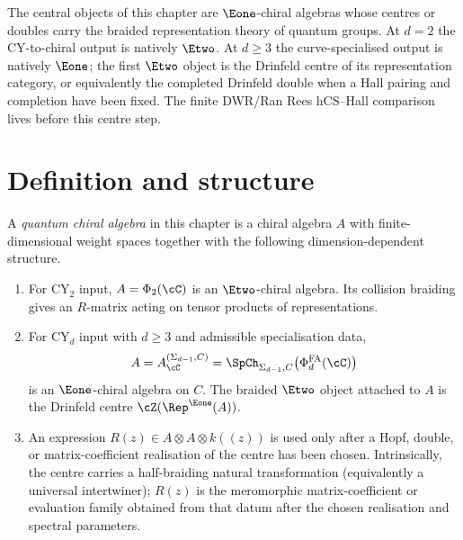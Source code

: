 The central objects of this chapter are $\Eone$-chiral algebras whose
centres or doubles carry the braided representation theory of quantum
groups.  At $d=2$ the CY-to-chiral output is natively $\Etwo$.  At
$d\geq 3$ the curve-specialised output is natively $\Eone$; the first
$\Etwo$ object is the Drinfeld centre of its representation category, or
equivalently the completed Drinfeld double when a Hall pairing and
completion have been fixed.  The finite DWR/Ran Rees hCS--Hall
comparison lives before this centre step.

\section{Definition and structure}
\label{sec:qca-definition}

\begin{definition}
\label{def:qca-dimension-stratified}
A \emph{quantum chiral algebra} in this chapter is a chiral algebra $A$
with finite-dimensional weight spaces together with the following
dimension-dependent structure.
\begin{enumerate}[label=\textup{(\roman*)}]
\item For CY$_2$ input, $A=\Phi_2(\cC)$ is an $\Etwo$-chiral algebra.
Its collision braiding gives an $R$-matrix acting on tensor products of
representations.
\item For CY$_d$ input with $d\geq3$ and admissible specialisation data,
\[
 A=A_{\cC}^{(\Sigma_{d-1},C)}
   =\SpCh_{\Sigma_{d-1},C}\bigl(\PhiFA_d(\cC)\bigr)
\]
is an $\Eone$-chiral algebra on $C$.  The braided $\Etwo$ object
attached to $A$ is the Drinfeld centre
$\cZ(\Rep^{\Eone}(A))$.
\item An expression \(R(z)\in A\otimes A\otimes k((z))\) is used only
after a Hopf, double, or matrix-coefficient realisation of the centre has
been chosen.  Intrinsically, the centre carries a half-braiding natural
transformation (equivalently a universal intertwiner); \(R(z)\) is the
meromorphic matrix-coefficient or evaluation family obtained from that
datum after the chosen realisation and spectral parameters.
\end{enumerate}
\end{definition}

